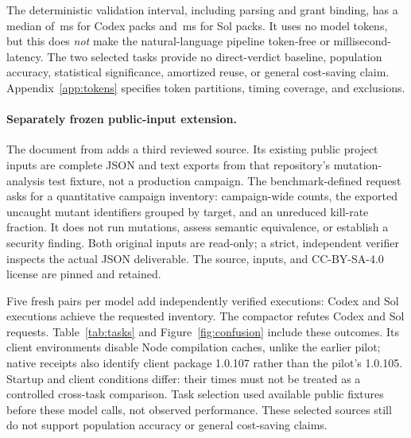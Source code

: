 The deterministic validation interval, including parsing and grant binding,
has a median of \PilotCodexCheckerMs{}\,ms for Codex packs and
\PilotSolCheckerMs{}\,ms for Sol packs. It uses no model tokens, but
this does \emph{not} make the natural-language pipeline token-free or
millisecond-latency. The two selected tasks provide no direct-verdict
baseline, population accuracy, statistical significance, amortized reuse,
or general cost-saving claim. Appendix~\ref{app:tokens} specifies token
partitions, timing coverage, and exclusions.

\paragraph{Separately frozen public-input extension.}
The  document from  adds a
third reviewed source. Its existing public project inputs are complete
JSON and text exports from that repository's mutation-analysis test fixture,
not a production campaign. The benchmark-defined request asks for a
quantitative campaign inventory: campaign-wide counts, the exported
uncaught mutant identifiers grouped by target, and an unreduced kill-rate
fraction. It does not run mutations, assess semantic equivalence, or
establish a security finding. Both original inputs are read-only; a strict,
independent verifier inspects the actual JSON deliverable. The source,
inputs, and CC-BY-SA-4.0 license are pinned and retained.

Five fresh pairs per model add \ExtensionExecutions{} independently
verified executions: \ExtensionCodexAchieved{} Codex and
\ExtensionSolAchieved{} Sol executions achieve the requested inventory.
The compactor refutes \ExtensionCodexRefuted{} Codex and
\ExtensionSolRefuted{} Sol requests. Table~\ref{tab:tasks} and
Figure~\ref{fig:confusion} include these outcomes. Its client environments
disable Node compilation caches,
unlike the earlier pilot; native receipts also identify client package
1.0.107 rather than the pilot's 1.0.105. Startup and client conditions differ:
their times
must not be treated as a controlled cross-task comparison. Task selection
used available public fixtures before these model calls, not observed
performance. These selected sources still do not support population
accuracy or general cost-saving claims.

